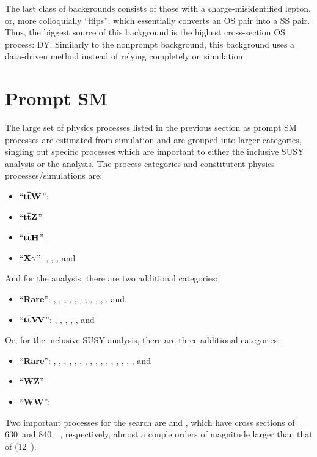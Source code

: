 The last class of backgrounds consists of those with a charge-misidentified lepton, or,
more colloquially ``flips'', which essentially
converts an OS pair into a SS pair. Thus, the biggest source of this background is 
the highest cross-section OS process: DY. Similarly to
the nonprompt background, this background uses a data-driven method instead of 
relying completely on simulation.

\section{Prompt SM}

The large set of physics processes listed in the previous section as prompt SM processes
are estimated from simulation and are grouped into larger categories, singling out
specific processes which are important to either  the inclusive SUSY analysis
or the \smft analysis. The process categories and constitutent physics processes/simulations
are:

\begin{itemize}
    \item ``$\mathbf{t\bar{t} W}$'': \ttW
    \item ``$\mathbf{t\bar{t} Z}$'': \ttZ
    \item ``$\mathbf{t\bar{t}H}$'': \ttH
    \item ``$\mathbf{X\gamma}$'': \Wgamma, \Zgamma, \ttgamma, and \tgamma
\end{itemize}

And for the \smft analysis, there are two additional categories:
\begin{itemize}
    \item ``\textbf{Rare}'': \ttt, \tttW, \ZZ, \WH, \ZH, \WZgamma, \WWgamma, \tZgamma, \tWZ, \WpWp, \WZ, and \WW
    \item ``$\mathbf{t\bar{t}V\!V}$'': \ttWW, \ttWZ, \ttZZ, \ttWH, \ttZH, and \ttHH
\end{itemize}

Or, for the inclusive SUSY analysis, there are three additional categories:
\begin{itemize}
    \item ``\textbf{Rare}'': \ttt, \tttW, \ZZ, \WW, \WH, \ZH, \WZgamma, \WWgamma, \tZgamma, \tWZ, \ttWW, \ttWZ, \ttZZ, \ttWH, \ttZH, \ttHH, and \tttt
    \item ``\textbf{WZ}'': \WZ
    \item ``\textbf{WW}'': \WpWp
\end{itemize}

Two important processes for the \smft search are \ttW and \ttZ, which have cross sections
of 630~\ifb and 840~\ifb~\cite{CMS:Sirunyan2017uzs}, respectively, almost a couple orders of magnitude larger than that of
\tttt (12~\ifb).

